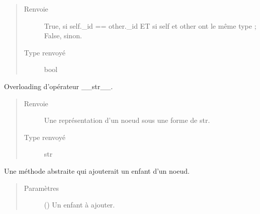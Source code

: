 \documentclass[letterpaper,10pt,french]{sphinxmanual}
\begin{document}
\begin{fulllineitems}
\begin{fulllineitems}
\begin{quote}
\begin{description}
\item[{Renvoie}] \leavevmode
{} \textendash{} True, si self.\_id == other.\_id ET si self et other ont le même type ; False, sinon.

\item[{Type renvoyé}] \leavevmode
bool

\end{description}\end{quote}

\end{fulllineitems}


\begin{fulllineitems}
\label{\detokenize{index:StrategyTree.NodeST.__str__}}
Overloading d’opérateur \_\_str\_\_.
\begin{quote}\begin{description}
\item[{Renvoie}] \leavevmode
{} \textendash{} Une représentation d’un noeud sous une forme de str.

\item[{Type renvoyé}] \leavevmode
str

\end{description}\end{quote}

\end{fulllineitems}


\begin{fulllineitems}
\label{\detokenize{index:StrategyTree.NodeST.add_child}}
Une méthode abstraite qui ajouterait un enfant d’un noeud.
\begin{quote}\begin{description}
\item[{Paramètres}] \leavevmode
{} ({\hyperref[\detokenize{index:StrategyTree.NodeST}]{}}) \textendash{} Un enfant à ajouter.

\end{description}\end{quote}


\end{fulllineitems}
\end{fulllineitems}
\end{document}

